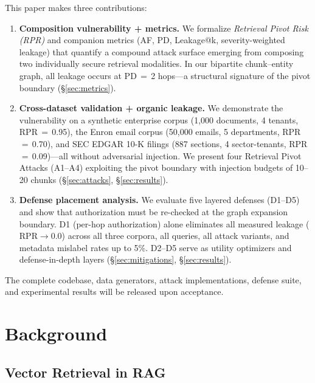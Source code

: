 \documentclass[letterpaper,twocolumn,10pt]{article}
\begin{document}
This paper makes three contributions:

\begin{enumerate}
\item \textbf{Composition vulnerability + metrics.} We formalize
  \emph{Retrieval Pivot Risk (RPR)} and companion metrics (AF, PD,
  Leakage@k, severity-weighted leakage) that quantify a compound
  attack surface emerging from composing two individually secure
  retrieval modalities. In our bipartite chunk--entity graph,
  all leakage occurs at PD\,$=$\,2 hops---a structural signature of
  the pivot boundary (\S\ref{sec:metrics}).

\item \textbf{Cross-dataset validation + organic leakage.} We
  demonstrate the vulnerability on a synthetic enterprise corpus
  (1{,}000 documents, 4 tenants, RPR\,$=$\,0.95), the Enron email
  corpus (50{,}000 emails, 5 departments, RPR\,$=$\,0.70), and SEC
  EDGAR 10-K filings (887 sections, 4 sector-tenants,
  RPR\,$=$\,0.09)---all without adversarial injection. We present four
  Retrieval Pivot Attacks (A1--A4) exploiting the pivot boundary with
  injection budgets of 10--20 chunks
  (\S\ref{sec:attacks}, \S\ref{sec:results}).

\item \textbf{Defense placement analysis.} We evaluate five layered
  defenses (D1--D5) and show that authorization must be re-checked at
  the graph expansion boundary. D1 (per-hop authorization) alone
  eliminates all measured leakage ($\text{RPR} \to 0.0$) across all
  three corpora, all queries, all attack variants, and metadata mislabel
  rates up to 5\%. D2--D5 serve as utility optimizers and
  defense-in-depth layers
  (\S\ref{sec:mitigations}, \S\ref{sec:results}).
\end{enumerate}

The complete codebase, data generators, attack implementations,
defense suite, and experimental results will be released upon
acceptance.

\section{Background}
\label{sec:background}

\subsection{Vector Retrieval in RAG}
\end{document}
